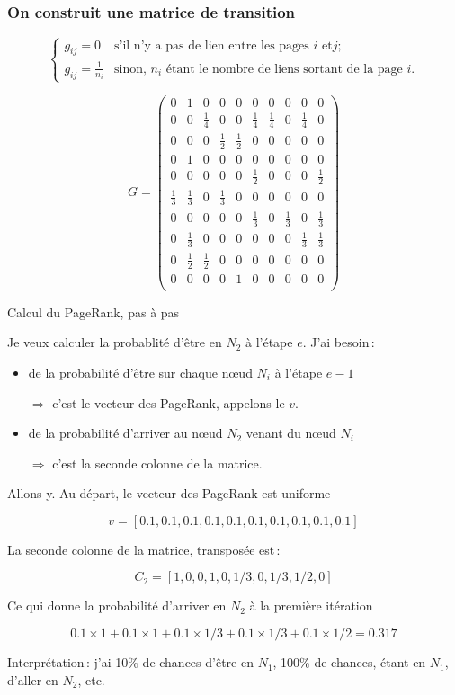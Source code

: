 \begin{frame}
\frametitle{On construit une \alert{matrice de transition}}

\[\begin{cases} g_{ij}=0&\text{s'il n'y a pas de lien entre les pages  $i$ et
$j$;}\\ g_{ij}=\frac{1}{n_i}&\text{sinon, $n_i$ étant le nombre de liens sortant de la page $i$.}\end{cases}\]


\[
G=\begin{pmatrix}
0&1&0&0&0&0&0&0&0&0\\
0&0&\frac 1 4&0&0&\frac 1 4&\frac 1 4&0&\frac 1 4&0\\
0&0&0&\frac 1 2&\frac 1 2&0&0&0&0&0\\
0&1&0&0&0&0&0&0&0&0\\
0&0&0&0&0&\frac 1 2&0&0&0&\frac 1 2\\
\frac 1 3&\frac 1 3&0&\frac 1 3&0&0&0&0&0&0\\
0&0&0&0&0&\frac 1 3&0&\frac 1 3&0&\frac 1 3\\
0&\frac 1 3&0&0&0&0&0&0&\frac 1 3&\frac 1 3\\
0&\frac 1 2&\frac 1 2&0&0&0&0&0&0&0\\
0&0&0&0&1&0&0&0&0&0\\
\end{pmatrix}
\]
\end{frame}

\begin{frame}{Calcul du PageRank, pas à pas}

Je veux calculer la probablité d'être en $N_2$ à
l'étape $e$. J'ai besoin\,:

\begin{itemize}
  \item de la probabilité d'être sur chaque n{\oe}ud $N_i$ à l'étape  $e-1$
  
     $\Rightarrow$ c'est le vecteur des PageRank, appelons-le $v$.
     
  \item de la probabilité d'arriver au n{\oe}ud $N_2$ venant du n{\oe}ud $N_i$ 
  
   $\Rightarrow$ c'est la seconde \alert{colonne} de la matrice.    
\end{itemize}

Allons-y. Au départ, le vecteur des PageRank est uniforme

 $$v= [0.1, 0.1, 0.1, 0.1, 0.1, 0.1, 0.1, 0.1, 0.1, 0.1]$$
 
La seconde colonne de la matrice, \alert{transposée} est\,:

 $$C_2= [1, 0, 0, 1, 0, 1/3, 0, 1/3, 1/2, 0]$$ 
 
Ce qui donne la probabilité d'arriver en $N_2$ à la première itération

$$0.1 \times 1 + 0.1 \times 1 + 0.1 \times 1/3 + 0.1 \times 1/3+ 0.1 \times 1/2 = 0.317$$

Interprétation\,: j'ai 10\% de chances d'être en $N_1$, 100\% de chances, étant en $N_1$, d'aller en $N_2$, etc.
\end{frame}

